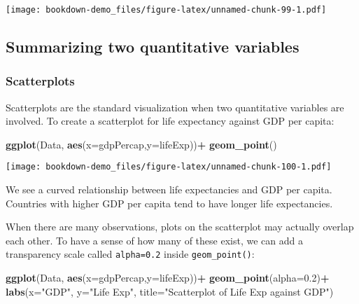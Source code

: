 \documentclass[
]{book}
\newenvironment{Shaded}{\begin{snugshade}}{\end{snugshade}}
\newcommand{\AttributeTok}[1]{\textcolor[rgb]{0.13,0.29,0.53}{#1}}
\newcommand{\FloatTok}[1]{\textcolor[rgb]{0.00,0.00,0.81}{#1}}
\newcommand{\FunctionTok}[1]{\textcolor[rgb]{0.13,0.29,0.53}{\textbf{#1}}}
\newcommand{\NormalTok}[1]{#1}
\newcommand{\SpecialCharTok}[1]{\textcolor[rgb]{0.81,0.36,0.00}{\textbf{#1}}}
\newcommand{\StringTok}[1]{\textcolor[rgb]{0.31,0.60,0.02}{#1}}
\begin{document}
\texttt{[image: bookdown-demo\_files/figure-latex/unnamed-chunk-99-1.pdf]}

\hypertarget{summarizing-two-quantitative-variables}{%
\subsection{Summarizing two quantitative variables}\label{summarizing-two-quantitative-variables}}

\hypertarget{scatterplots}{%
\subsubsection{Scatterplots}\label{scatterplots}}

Scatterplots are the standard visualization when two quantitative variables are involved. To create a scatterplot for life expectancy against GDP per capita:

\begin{Shaded}
\begin{Highlighting}[]
\FunctionTok{ggplot}\NormalTok{(Data, }\FunctionTok{aes}\NormalTok{(}\AttributeTok{x=}\NormalTok{gdpPercap,}\AttributeTok{y=}\NormalTok{lifeExp))}\SpecialCharTok{+}
  \FunctionTok{geom\_point}\NormalTok{()}
\end{Highlighting}
\end{Shaded}

\texttt{[image: bookdown-demo\_files/figure-latex/unnamed-chunk-100-1.pdf]}

We see a curved relationship between life expectancies and GDP per capita. Countries with higher GDP per capita tend to have longer life expectancies.

When there are many observations, plots on the scatterplot may actually overlap each other. To have a sense of how many of these exist, we can add a transparency scale called \texttt{alpha=0.2} inside \texttt{geom\_point()}:

\begin{Shaded}
\begin{Highlighting}[]
\FunctionTok{ggplot}\NormalTok{(Data, }\FunctionTok{aes}\NormalTok{(}\AttributeTok{x=}\NormalTok{gdpPercap,}\AttributeTok{y=}\NormalTok{lifeExp))}\SpecialCharTok{+}
  \FunctionTok{geom\_point}\NormalTok{(}\AttributeTok{alpha=}\FloatTok{0.2}\NormalTok{)}\SpecialCharTok{+}
  \FunctionTok{labs}\NormalTok{(}\AttributeTok{x=}\StringTok{"GDP"}\NormalTok{, }\AttributeTok{y=}\StringTok{"Life Exp"}\NormalTok{, }
       \AttributeTok{title=}\StringTok{"Scatterplot of Life Exp against GDP"}\NormalTok{)}
\end{Highlighting}
\end{Shaded}
\end{document}
